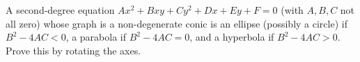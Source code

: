 A second-degree equation $Ax^2+Bxy+Cy^2+Dx+Ey+F=0$ (with $A,B,C$ not all zero) whose graph is a non-degenerate conic is an ellipse (possibly a circle) if $B^2-4AC<0$, a parabola if $B^2-4AC=0$, and a hyperbola if $B^2-4AC>0$. Prove this by rotating the axes.
